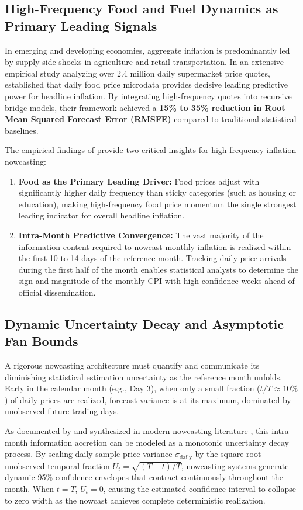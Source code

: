 \subsection{High-Frequency Food and Fuel Dynamics as Primary Leading Signals}
\hs In emerging and developing economies, aggregate inflation is predominantly led by supply-side shocks in agriculture and retail transportation. In an extensive empirical study analyzing over 2.4 million daily supermarket price quotes, \cite{macias2023nowcasting} established that daily food price microdata provides decisive leading predictive power for headline inflation. By integrating high-frequency quotes into recursive bridge models, their framework achieved a \textbf{15\% to 35\% reduction in Root Mean Squared Forecast Error (RMSFE)} compared to traditional statistical baselines.

\hs The empirical findings of \cite{macias2023nowcasting} provide two critical insights for high-frequency inflation nowcasting:
\begin{enumerate}
    \item \textbf{Food as the Primary Leading Driver:} Food prices adjust with significantly higher daily frequency than sticky categories (such as housing or education), making high-frequency food price momentum the single strongest leading indicator for overall headline inflation.
    \item \textbf{Intra-Month Predictive Convergence:} The vast majority of the information content required to nowcast monthly inflation is realized within the first 10 to 14 days of the reference month. Tracking daily price arrivals during the first half of the month enables statistical analysts to determine the sign and magnitude of the monthly CPI with high confidence weeks ahead of official dissemination.
\end{enumerate}

\subsection{Dynamic Uncertainty Decay and Asymptotic Fan Bounds}
\hs A rigorous nowcasting architecture must quantify and communicate its diminishing statistical estimation uncertainty as the reference month unfolds. Early in the calendar month (e.g., Day 3), when only a small fraction ($t/T \approx 10\%$) of daily prices are realized, forecast variance is at its maximum, dominated by unobserved future trading days.

\hs As documented by \cite{bates1969combination} and synthesized in modern nowcasting literature \citep{bis2024spectrum}, this intra-month information accretion can be modeled as a monotonic uncertainty decay process. By scaling daily sample price variance $\sigma_{\text{daily}}$ by the square-root unobserved temporal fraction $U_t = \sqrt{(T-t)/T}$, nowcasting systems generate dynamic 95\% confidence envelopes that contract continuously throughout the month. When $t = T$, $U_t = 0$, causing the estimated confidence interval to collapse to zero width as the nowcast achieves complete deterministic realization.

